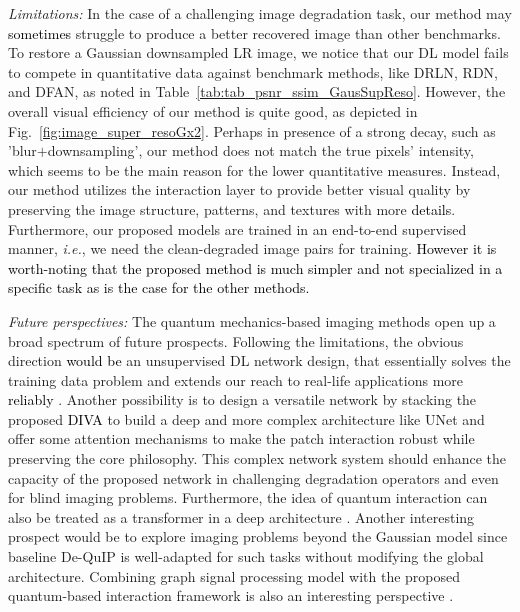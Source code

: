 \documentclass[10pt,journal,compsoc]{IEEEtran}
\newcommand{\sd}{\textcolor{black}}
\newcommand{\dk}{\textcolor{black}}
\begin{document}
\textit{Limitations:}
In the case of a challenging image degradation task, our method may \dk{sometimes} struggle to produce a better recovered image than other benchmarks. To restore a Gaussian downsampled LR image, we notice that our DL model fails to compete in quantitative data against benchmark methods, like DRLN, RDN, and DFAN, as noted in Table~\ref{tab:tab_psnr_ssim_GausSupReso}. However, the overall visual efficiency of our method is quite good, as depicted in Fig.~\ref{fig:image_super_resoGx2}. Perhaps in presence of a strong decay, such as 'blur$+$downsampling', our method does not match the true pixels' intensity, which seems to be the main reason for the lower quantitative measures. Instead, our method utilizes the interaction layer to provide better visual quality by preserving the image structure, patterns, and textures with more \dk{details}. Furthermore, our proposed models are trained in an end-to-end supervised manner, \textit{i.e.}, we need the clean-degraded image pairs for training. %
\dk{However it is worth-noting that the proposed  method is much  simpler and not specialized in a specific task as  is the case for the other methods.}







\textit{Future perspectives:}
The quantum mechanics-based imaging methods open up a broad spectrum of future prospects. Following the limitations, the obvious direction \sd{would be} an unsupervised DL network design, that essentially solves the training data problem and extends our reach to real-life applications more \sd{reliably} \cite{Morsier2016kernel, Pereyra2017fast}.
Another possibility is to design a versatile network by stacking the proposed \dk{DIVA} to build a deep and more complex architecture like UNet \cite{Kong2022deep} and offer some attention mechanisms \cite{Anwar2022densely} to make the patch interaction robust while preserving the core philosophy. This complex network system should enhance the capacity of the proposed network in challenging degradation operators and even for blind imaging problems. Furthermore, the idea of quantum interaction can also be treated as a transformer in a deep architecture \cite{Wang2022Uformer}. Another interesting prospect would be to explore imaging problems beyond the Gaussian model since baseline De-QuIP is well-adapted for such tasks without modifying the global architecture. Combining graph signal processing model with the proposed quantum-based interaction framework is also an interesting perspective \cite{Hua2019learning}.
\end{document}
